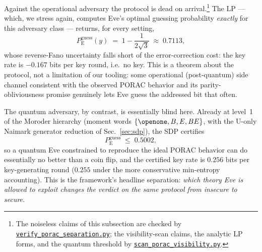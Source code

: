 \documentclass[aps,pra,twocolumn,superscriptaddress,longbibliography,nofootinbib]{revtex4-2}
\newcommand{\Eve}{\mathrm{E}}
\newcommand{\pguess}{P_{\Eve}^{\mathrm{guess}}}
\newcommand{\repoBase}{https://github.com/eliewolfe/RandomnessWinterSchool2026/blob/main/paper/scripts}
\newcommand{\repoScript}[1]{\href{\repoBase/#1}{\texttt{#1}}}
\begin{document}
Against the operational adversary the protocol is dead on
arrival.\footnote{The noiseless claims of this subsection are checked
by \repoScript{verify\_porac\_separation.py}; the visibility-scan
claims, the analytic LP forms, and the quantum threshold by
\repoScript{scan\_porac\_visibility.py}.} The
LP --- which, we stress again, computes Eve's optimal guessing
probability \emph{exactly} for this adversary class --- returns, for
every setting,
\begin{equation}
  \pguess(y) \;=\; 1-\frac{1}{2\sqrt3}\;\approx\;0.7113 ,
\end{equation}
whose reverse-Fano uncertainty falls short of the error-correction
cost: the key rate is $-0.167$ bits per key round, i.e.\ no key. This
is a theorem about the protocol, not a limitation of our tooling: some
operational (post-quantum) side channel consistent with the observed
PORAC behavior and its parity-obliviousness promise genuinely lets Eve
guess the addressed bit that often.

The quantum adversary, by contrast, is essentially blind here. Already
at level~1 of the Moroder hierarchy (moment words
$\{\openone,B,E,BE\}$, with the U-only Naimark generator reduction of
Sec.~\ref{sec:sdp}), the SDP certifies
\begin{equation}
  \pguess \;\le\; 0.5002 ,
\end{equation}
so a quantum Eve constrained to reproduce the ideal PORAC behavior can
do essentially no better than a coin flip, and the certified key rate is
$0.256$ bits per key-generating round ($0.255$ under the more
conservative min-entropy accounting). This is the framework's headline
separation: \emph{which theory Eve is allowed to exploit changes the
verdict on the same protocol from insecure to secure.}
\end{document}
